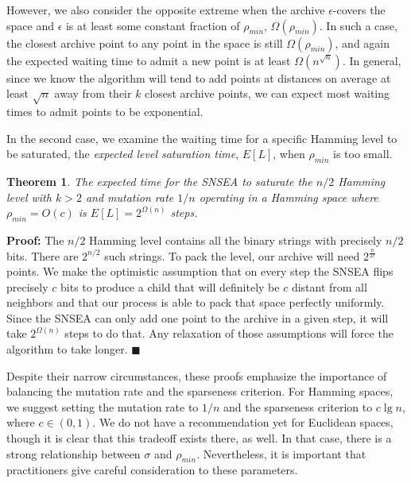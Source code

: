 \documentclass[twoside]{article}
\newtheorem{theorem}{Theorem}
\begin{document}
\vspace*{1ex}

However, we also consider the opposite extreme when the archive $\epsilon$-covers the space and $\epsilon$ is at least some constant fraction of $\rho_{min}$, $\Omega(\rho_{min})$.  In such a case, the closest archive point to any point in the space is still $\Omega(\rho_{min})$, and again the expected waiting time to admit a new point is at least $\Omega(n^{\sqrt{n}})$.  In general, since we know the algorithm will tend to add points at distances on average at least $\sqrt{n}$ away from their $k$ closest archive points, we can expect most waiting times to admit points to be exponential.



In the second case, we examine the waiting time for a specific Hamming level to be saturated, the \emph{expected level saturation time}, $E[L]$, when $\rho_{min}$ is too small.

\begin{theorem}
The expected time for the SNSEA to saturate the $n/2$ Hamming level with $k>2$ and mutation rate $1/n$ operating in a Hamming space where $\rho_{min} = O(c)$ is $E[L] = 2^{\Omega(n)}$ steps.
\end{theorem}
\textbf{Proof:} The $n/2$ Hamming level contains all the binary strings with precisely $n/2$ bits.  There are $2^{n/2}$ such strings.  To pack the level, our archive will need $2^\frac{n}{2c}$ points.  We make the optimistic assumption that on every step the SNSEA flips precisely $c$ bits to produce a child that will definitely be $c$ distant from all neighbors and that our process is able to pack that space perfectly uniformly.  Since the SNSEA can only add one point to the archive in a given step, it will take $2^{\Omega(n)}$ steps to do that. Any relaxation of those assumptions will force the algorithm to take longer. $\blacksquare$

\vspace*{1ex}

Despite their narrow circumstances, these proofs emphasize the importance of balancing the mutation rate and the sparseness criterion.  For Hamming spaces, we suggest setting the mutation rate to $1/n$ and the sparseness criterion to $c\lg n$, where $c\in (0,1)$.  We do not have a recommendation yet for Euclidean spaces, though it is clear that this tradeoff exists there, as well.  In that case, there is a strong relationship between $\sigma$ and $\rho_{min}$.  Nevertheless, it is important that practitioners give careful consideration to these parameters.
\end{document}
